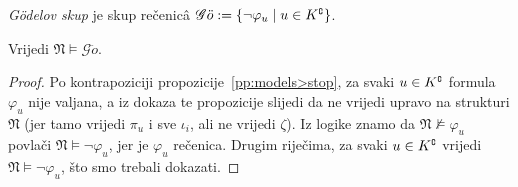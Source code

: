 \begin{definicija}[{name=[Gödelov skup]}]
\emph{Gödelov skup} je skup rečenicâ
    $\mathscr G\ddot o:=\{\lnot\varphi_u\mid u\in K\sp{{\scriptscriptstyle\complement}}\}$.
\end{definicija}

\begin{propozicija}[{name=[istinitost Gödelovog skupa rečenica u $\mathfrak N$]}]
Vrijedi $\mathfrak N\models\mathscr G\ddot o$.
\end{propozicija}
\begin{proof}
Po kontrapoziciji propozicije~\ref{pp:models>stop}, za svaki $u\in K\sp{{\scriptscriptstyle\complement}}$ formula $\varphi_u$ nije valjana, a iz dokaza te propozicije slijedi da ne vrijedi upravo na strukturi $\mathfrak N$ (jer tamo vrijedi $\pi_u$ i sve $\iota_i$, ali ne vrijedi $\zeta$). Iz logike znamo da $\mathfrak N\nvDash\varphi_u$ povlači $\mathfrak N\models\lnot\varphi_u$, jer je $\varphi_u$ rečenica. Drugim riječima, za svaki $u\in K\sp{{\scriptscriptstyle\complement}}$ vrijedi $\mathfrak N\models\lnot\varphi_u$, što smo trebali dokazati.
\end{proof}

